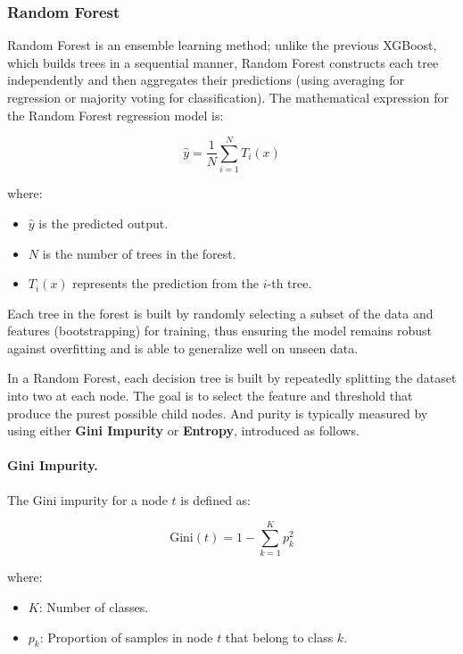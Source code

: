 \documentclass{article}
\begin{document}
\subsubsection{Random Forest}
Random Forest is an ensemble learning method; unlike the previous XGBoost, which builds trees in a sequential manner, Random Forest constructs each tree independently and then aggregates their predictions (using averaging for regression or majority voting for classification).
The mathematical expression for the Random Forest regression model is:

\begin{equation}
    \hat{y} = \frac{1}{N} \sum_{i=1}^{N} T_i(x)
\end{equation}

where:
\begin{itemize}
    \item \( \hat{y} \) is the predicted output.
    \item \( N \) is the number of trees in the forest.
    \item \( T_i(x) \) represents the prediction from the \( i \)-th tree.
\end{itemize}
Each tree in the forest is built by randomly selecting a subset of the data and features (bootstrapping) for training, thus ensuring the model remains robust against overfitting and is able to generalize well on unseen data.

In a Random Forest, each decision tree is built by repeatedly splitting the dataset into two at each node. 
The goal is to select the feature and threshold that produce the purest possible child nodes.
And purity is typically measured by using either \textbf{Gini Impurity} or \textbf{Entropy}, introduced as follows.

\paragraph{Gini Impurity.}
The Gini impurity for a node \( t \) is defined as:

\begin{equation}
    \text{Gini}(t) = 1 - \sum_{k=1}^{K} p_{k}^{2}
\end{equation}

\noindent where:
\begin{itemize}
    \item \( K \): Number of classes.
    \item \( p_k \): Proportion of samples in node \( t \) that belong to class \( k \).
\end{itemize}
\end{document}
